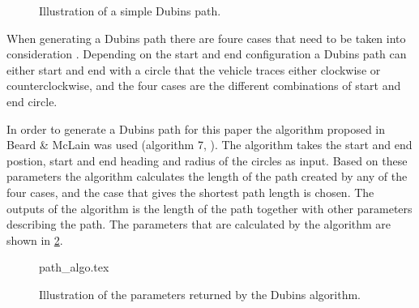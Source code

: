 \begin{figure}[]
    \centering
    \caption{Illustration of a simple Dubins path.}
	\label{fig:dubins_example}
\end{figure}

When generating a Dubins path there are foure cases that need to be taken into consideration \cite{suaBEARD}. Depending on the start and end configuration a Dubins path can either start and end with a circle that the vehicle traces either clockwise or counterclockwise, and the four cases are the different combinations of start and end circle.

In order to generate a Dubins path for this paper the algorithm proposed in Beard \& McLain was used (algorithm 7, \cite{suaBEARD}). The algorithm takes the start and end postion, start and end heading and radius of the circles as input. Based on these parameters the algorithm calculates the length of the path created by any of the four cases, and the case that gives the shortest path length is chosen. The outputs of the algorithm is the length of the path together with other parameters describing the path. The parameters that are calculated by the algorithm are shown in \ref{fig:dubins_algorithm}.

\begin{figure}
	{path_algo.tex}
	\caption{Illustration of the parameters returned by the Dubins algorithm.}
	\label{fig:dubins_algorithm}
\end{figure}

